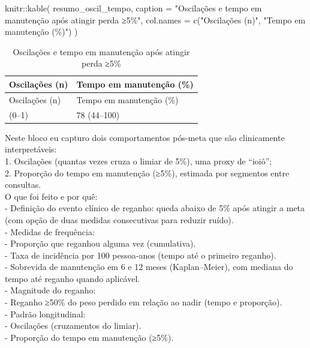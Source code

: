 \documentclass[
]{article}
\newenvironment{Shaded}{\begin{snugshade}}{\end{snugshade}}
\newcommand{\AttributeTok}[1]{\textcolor[rgb]{0.40,0.45,0.13}{#1}}
\newcommand{\FunctionTok}[1]{\textcolor[rgb]{0.28,0.35,0.67}{#1}}
\newcommand{\NormalTok}[1]{\textcolor[rgb]{0.00,0.23,0.31}{#1}}
\newcommand{\SpecialCharTok}[1]{\textcolor[rgb]{0.37,0.37,0.37}{#1}}
\newcommand{\StringTok}[1]{\textcolor[rgb]{0.13,0.47,0.30}{#1}}
\begin{document}
\begin{Shaded}
\begin{Highlighting}[]
\NormalTok{knitr}\SpecialCharTok{::}\FunctionTok{kable}\NormalTok{(}
\NormalTok{  resumo\_oscil\_tempo,}
  \AttributeTok{caption =} \StringTok{"Oscilações e tempo em manutenção após atingir perda ≥5\%"}\NormalTok{,}
  \AttributeTok{col.names =} \FunctionTok{c}\NormalTok{(}\StringTok{"Oscilações (n)"}\NormalTok{, }\StringTok{"Tempo em manutenção (\%)"}\NormalTok{)}
\NormalTok{)}
\end{Highlighting}
\end{Shaded}

\begin{longtable}[]{@{}ll@{}}
\caption{Oscilações e tempo em manutenção após atingir perda
≥5\%}\tabularnewline
\toprule\noalign{}
Oscilações (n) & Tempo em manutenção (\%) \\
\midrule\noalign{}
\endfirsthead
\toprule\noalign{}
Oscilações (n) & Tempo em manutenção (\%) \\
\midrule\noalign{}
\endhead
\bottomrule\noalign{}
\endlastfoot
0 (0--1) & 78 (44--100) \\
\end{longtable}

Neste bloco eu capturo dois comportamentos pós-meta que são clinicamente
interpretáveis:\\
1. Oscilações (quantas vezes cruza o limiar de 5\%), uma proxy de
``ioiô'';\\
2. Proporção do tempo em manutenção (≥5\%), estimada por segmentos entre
consultas.\\

O que foi feito e por quê:\\
- Definição do evento clínico de reganho: queda abaixo de 5\% após
atingir a meta (com opção de duas medidas consecutivas para reduzir
ruído).\\
- Medidas de frequência:\\
- Proporção que reganhou alguma vez (cumulativa).\\
- Taxa de incidência por 100 pessoa‑anos (tempo até o primeiro
reganho).\\
- Sobrevida de manutenção em 6 e 12 meses (Kaplan--Meier), com mediana
do tempo até reganho quando aplicável.\\
- Magnitude do reganho:\\
- Reganho ≥50\% do peso perdido em relação ao nadir (tempo e
proporção).\\
- Padrão longitudinal:\\
- Oscilações (cruzamentos do limiar).\\
- Proporção do tempo em manutenção (≥5\%).\\
\end{document}
